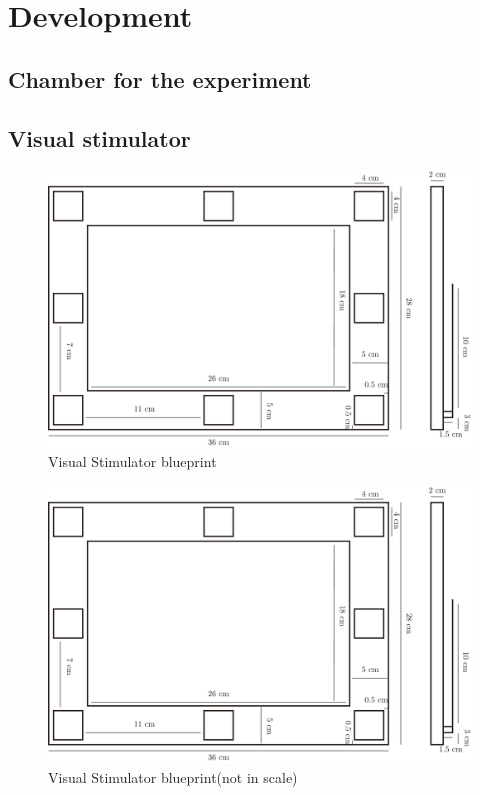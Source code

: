 \chapter{Development}

\label{ch:Development}

\setlength{\parindent}{4em}
\setlength{\parskip}{1em}
\renewcommand{\baselinestretch}{1.5}

\section{Chamber for the experiment}

\section{Visual stimulator}

\begin{figure}[ht]
	\centering
	\includegraphics[width=\textwidth]{chapter6/blueprint.pdf}
	\caption{Visual Stimulator blueprint}
\end{figure}

\begin{figure}[ht]
	\centering
	\includegraphics[width=\textwidth]{chapter6/blueprint.pdf}
	\caption{Visual Stimulator blueprint(not in scale)}
\end{figure}

